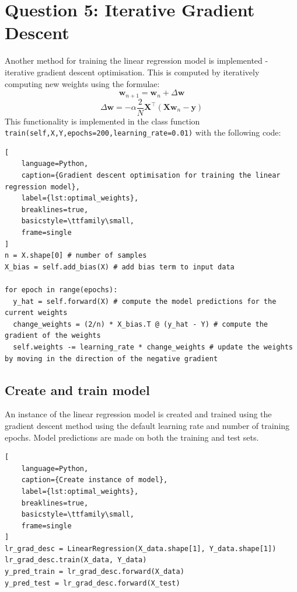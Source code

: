 \documentclass[11pt]{article}
\begin{document}
\section{Question 5: Iterative Gradient Descent}
Another method for training the linear regression model is implemented - iterative gradient descent optimisation. 
This is computed by iteratively computing new weights using the formulae:
\begin{equation}
    \mathbf{w}_{n+1} = \mathbf{w}_n + \Delta \mathbf{w}
\end{equation}
\begin{equation}
    \Delta \mathbf{w} = -\alpha \frac{2}{N} \mathbf{X}^\top (\mathbf{X} \mathbf{w}_n - \mathbf{y})
\end{equation}
This functionality is implemented in the class function \texttt{train(self,X,Y,epochs=200,learning\_rate=0.01)} with the following code:
\begin{lstlisting}[
    language=Python, 
    caption={Gradient descent optimisation for training the linear regression model},
    label={lst:optimal_weights},
    breaklines=true,
    basicstyle=\ttfamily\small,
    frame=single
]
n = X.shape[0] # number of samples
X_bias = self.add_bias(X) # add bias term to input data
        
for epoch in range(epochs):
  y_hat = self.forward(X) # compute the model predictions for the current weights
  change_weights = (2/n) * X_bias.T @ (y_hat - Y) # compute the gradient of the weights
  self.weights -= learning_rate * change_weights # update the weights by moving in the direction of the negative gradient
\end{lstlisting}

\subsection{Create and train model}
An instance of the linear regression model is created and trained using the gradient descent method using the default learning rate and number of training epochs. 
Model predictions are made on both the training and test sets.

\begin{lstlisting}[
    language=Python, 
    caption={Create instance of model},
    label={lst:optimal_weights},
    breaklines=true,
    basicstyle=\ttfamily\small,
    frame=single
]
lr_grad_desc = LinearRegression(X_data.shape[1], Y_data.shape[1])
lr_grad_desc.train(X_data, Y_data)
y_pred_train = lr_grad_desc.forward(X_data)
y_pred_test = lr_grad_desc.forward(X_test)
\end{lstlisting}
\end{document}
